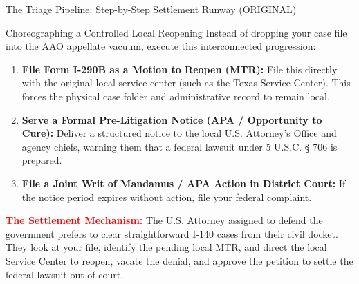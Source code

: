 \documentclass[11pt]{beamer}
\begin{document}
	\begin{frame}{The Triage Pipeline: Step-by-Step Settlement Runway (ORIGINAL)}
		\scriptsize
		\begin{block}{Choreographing a Controlled Local Reopening}
			Instead of dropping your case file into the AAO appellate vacuum, execute this interconnected progression:
			\vspace{0.15cm}
			\begin{enumerate}
				\item \textbf{File Form I-290B as a Motion to Reopen (MTR):} File this directly with the original local service center (such as the Texas Service Center). This forces the physical case folder and administrative record to remain local.
				\item \textbf{Serve a Formal Pre-Litigation Notice (APA / Opportunity to Cure):} Deliver a structured notice to the local U.S. Attorney's Office and agency chiefs, warning them that a federal lawsuit under 5 U.S.C. § 706 is prepared.
				\item \textbf{File a Joint Writ of Mandamus / APA Action in District Court:} If the notice period expires without action, file your federal complaint.
			\end{enumerate}
			\vspace{0.15cm}
			\textcolor{red}{\textbf{The Settlement Mechanism:}} The U.S. Attorney assigned to defend the government prefers to clear straightforward I-140 cases from their civil docket. They look at your file, identify the pending local MTR, and direct the local Service Center to reopen, vacate the denial, and approve the petition to settle the federal lawsuit out of court.
		\end{block}
	\end{frame}
	
	
\end{document}
